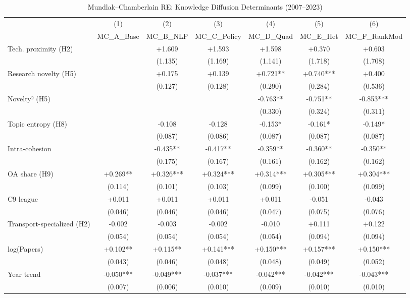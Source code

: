 \begin{table}[htbp]
\centering
\caption{Mundlak–Chamberlain RE: Knowledge Diffusion Determinants (2007–2023)}
\label{tab:mc_re}
\small
\begin{tabular}{lcccccc}
\toprule
 & (1) & (2) & (3) & (4) & (5) & (6) \\
 & MC\_A\_Base & MC\_B\_NLP & MC\_C\_Policy & MC\_D\_Quad & MC\_E\_Het & MC\_F\_RankMod \\
\midrule
Tech. proximity (H2) &  & +1.609 & +1.593 & +1.598 & +0.370 & +0.603 \\
 &  & (1.135) & (1.169) & (1.141) & (1.718) & (1.708) \\
Research novelty (H5) &  & +0.175 & +0.139 & +0.721** & +0.740*** & +0.400 \\
 &  & (0.127) & (0.128) & (0.290) & (0.284) & (0.536) \\
Novelty² (H5) &  &  &  & -0.763** & -0.751** & -0.853*** \\
 &  &  &  & (0.330) & (0.324) & (0.311) \\
Topic entropy (H8) &  & -0.108 & -0.128 & -0.153* & -0.161* & -0.149* \\
 &  & (0.087) & (0.086) & (0.087) & (0.087) & (0.087) \\
Intra-cohesion &  & -0.435** & -0.417** & -0.359** & -0.360** & -0.350** \\
 &  & (0.175) & (0.167) & (0.161) & (0.162) & (0.162) \\
OA share (H9) & +0.269** & +0.326*** & +0.324*** & +0.314*** & +0.305*** & +0.304*** \\
 & (0.114) & (0.101) & (0.103) & (0.099) & (0.100) & (0.099) \\
C9 league & +0.011 & +0.011 & +0.011 & +0.011 & -0.051 & -0.043 \\
 & (0.046) & (0.046) & (0.046) & (0.047) & (0.075) & (0.076) \\
Transport-specialized (H2) & -0.002 & -0.003 & -0.002 & -0.010 & +0.111 & +0.122 \\
 & (0.054) & (0.054) & (0.054) & (0.054) & (0.094) & (0.094) \\
log(Papers) & +0.102** & +0.115** & +0.141*** & +0.150*** & +0.157*** & +0.150*** \\
 & (0.043) & (0.046) & (0.048) & (0.048) & (0.049) & (0.052) \\
Year trend & -0.050*** & -0.049*** & -0.037*** & -0.042*** & -0.042*** & -0.043*** \\
 & (0.007) & (0.006) & (0.010) & (0.009) & (0.010) & (0.010) \\

\end{tabular}
\end{table}
